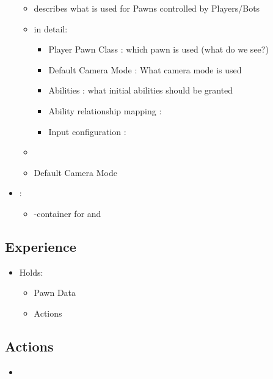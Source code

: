 \begin{itemize}
                \begin{itemize}
                    \item describes what is used for Pawns controlled by Players/Bots
                    \item in detail:
                    \begin{itemize}
                        \item Player Pawn Class : which pawn is used (what do we see?)
                        \item Default Camera Mode : What camera mode is used
                        \item Abilities : what initial abilities should be granted
                        \item Ability relationship mapping : 
                        \item Input configuration : 
                    \end{itemize}
                    \item 
                    \item Default Camera Mode
                \end{itemize}
                \item {}:
                \begin{itemize}
                    \item {}-container for   and 
                \end{itemize}
            \end{itemize}

        \subsection{Experience}
            \begin{itemize}
                \item Holds:
                \begin{itemize}
                    \item Pawn Data
                    \item Actions
                \end{itemize}
            \end{itemize}

        \subsection{Actions}
            \begin{itemize}
                \item 
            \end{itemize}

